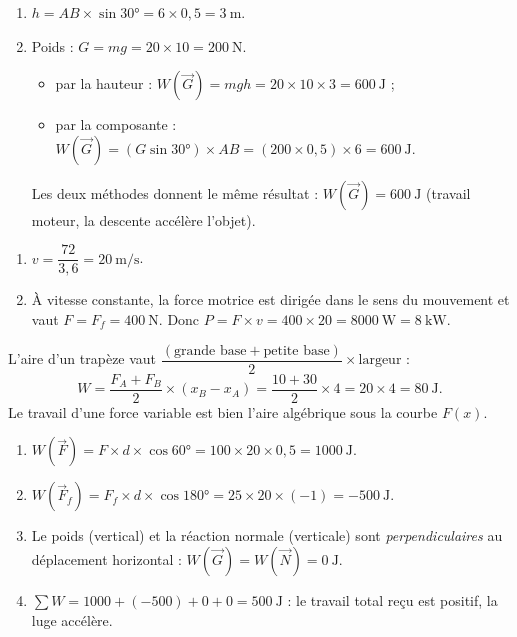 \documentclass[11pt,a4paper]{article}
\newcommand{\vv}[1]{\vec{#1}}\newcommand{\ds}{\displaystyle}
\begin{document}

\begin{corrige}
\begin{enumerate}[label=\alph*)]
  \item $h=AB\times\sin\ang{30}=6\times0,5=\qty{3}{\metre}$.
  \item Poids : $G=mg=20\times10=\qty{200}{\newton}$.
        \begin{itemize}[leftmargin=1.4em,topsep=1pt]
          \item par la hauteur : $W(\vv G)=mgh=20\times10\times3=\qty{600}{\joule}$ ;
          \item par la composante : $W(\vv G)=(G\sin\ang{30})\times AB=(200\times0,5)\times6=\qty{600}{\joule}$.
        \end{itemize}
        Les deux méthodes donnent le même résultat : $W(\vv G)=\qty{600}{\joule}$ (travail moteur, la
        descente accélère l'objet).
\end{enumerate}
\end{corrige}

\begin{corrige}
\begin{enumerate}[label=\alph*)]
  \item $v=\dfrac{72}{3,6}=\qty{20}{\metre\per\second}$.
  \item À vitesse constante, la force motrice est dirigée dans le sens du mouvement et vaut
        $F=F_f=\qty{400}{\newton}$. Donc
        $P=F\times v=400\times20=\qty{8000}{\watt}=\qty{8}{\kilo\watt}$.
\end{enumerate}
\end{corrige}

\begin{corrige}
L'aire d'un trapèze vaut $\dfrac{(\text{grande base}+\text{petite base})}{2}\times\text{largeur}$ :
\[
W=\frac{F_A+F_B}{2}\times(x_B-x_A)=\frac{10+30}{2}\times4=20\times4=\qty{80}{\joule}.
\]
Le travail d'une force variable est bien l'aire algébrique sous la courbe $F(x)$.
\end{corrige}

\begin{corrige}
\begin{enumerate}[label=\alph*)]
  \item $W(\vv F)=F\times d\times\cos\ang{60}=100\times20\times0,5=\qty{1000}{\joule}$.
  \item $W(\vv F_f)=F_f\times d\times\cos\ang{180}=25\times20\times(-1)=\qty{-500}{\joule}$.
  \item Le poids (vertical) et la réaction normale (verticale) sont \emph{perpendiculaires} au
        déplacement horizontal : $W(\vv G)=W(\vv N)=\qty{0}{\joule}$.
  \item $\sum W=1000+(-500)+0+0=\qty{500}{\joule}$ : le travail total reçu est positif, la luge
        accélère.
\end{enumerate}
\end{corrige}
\end{document}

